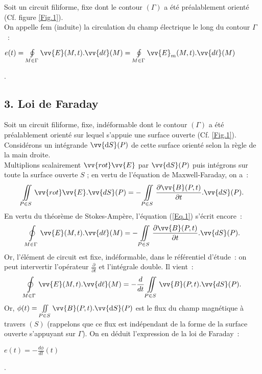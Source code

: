 \documentclass{article}
\newcommand{\mathcolorbox}[2]{\colorbox{#1}{$#2$}}
\let\oldiint\iint
\renewcommand{\iint}{\oldiint\limits}
\let\oldoint\oint
\renewcommand{\oint}{\oldoint\limits}
\renewcommand\overrightarrow{\vv}
\begin{document}
Soit un circuit filiforme, fixe dont le contour $(\Gamma)$
a
été préalablement orienté (Cf. figure \ref{Fig.1}). \\
On appelle fem (induite) la circulation du champ électrique le long
du contour
$\Gamma$ : \\
\centerline{\mathcolorbox{gray!20}{e(t) = \oint_{M \in
\Gamma}\overrightarrow{E}(M,t).\overrightarrow{d\ell}(M) = \oint_{M
\in \Gamma}\overrightarrow{E}_{m}(M,t).\overrightarrow{d\ell}(M)}}.

\subsection*{3. Loi de Faraday}
Soit un circuit filiforme, fixe, indéformable dont le
contour $(\Gamma)$ a été préalablement orienté sur lequel s'appuie
une surface ouverte (Cf. \ref{Fig.1}). Considérons un intégrande
$\overrightarrow{\mathrm{d}S}(P)$ de cette surface orienté selon la règle
de la main droite. \\
Multiplions scalairement $\overrightarrow{rot}\overrightarrow{E}$
par $\overrightarrow{\mathrm{d}S}(P)$ puis intégrons sur toute la surface
ouverte $S$ ; en vertu de l'équation de Maxwell-Faraday, on a :
\begin{eqnarray}\label{Eq.1}
\iint_{P\in S}
\overrightarrow{rot}\overrightarrow{E}.\overrightarrow{dS}(P) =
-\iint_{P\in S} \frac{\partial \overrightarrow{B}(P,t)}{\partial
t}.\overrightarrow{dS}(P).
\end{eqnarray}
En vertu du théorème de Stokes-Ampère, l'équation (\ref{Eq.1})
s'écrit encore :
\begin{eqnarray}\label{Eq.2}
\oint_{M\in \Gamma}\overrightarrow{E}(M,t).\overrightarrow{d\ell}(M)
= -\iint_{P\in S} \frac{\partial \overrightarrow{B}(P,t)}{\partial
t}.\overrightarrow{dS}(P).
\end{eqnarray}
Or, l'élément de circuit est fixe, indéformable, dans le référentiel
d'étude : on peut intervertir l'opérateur $\frac{\partial}{\partial
t}$ et l'intégrale double. Il vient :
\begin{eqnarray}\label{Eq.3}
\oint_{M\in \Gamma}\overrightarrow{E}(M,t).\overrightarrow{d\ell}(M)
= - \frac{d}{dt}\iint_{P \in
S}\overrightarrow{B}(P,t).\overrightarrow{dS}(P).
\end{eqnarray}
Or, $\phi(t) = \iint_{P\in
S}\overrightarrow{B}(P,t).\overrightarrow{\mathrm{d}S}(P)$ est le flux du
champ magnétique à travers $(S)$ (rappelons que ce flux est
indépendant de la forme de la surface ouverte s'appuyant sur
$\Gamma$). On en déduit l'expression de la loi de Faraday : \\
\centerline{\mathcolorbox{gray!20}{e(t) = -\frac{d\phi}{dt}(t)}}.
\end{document}
